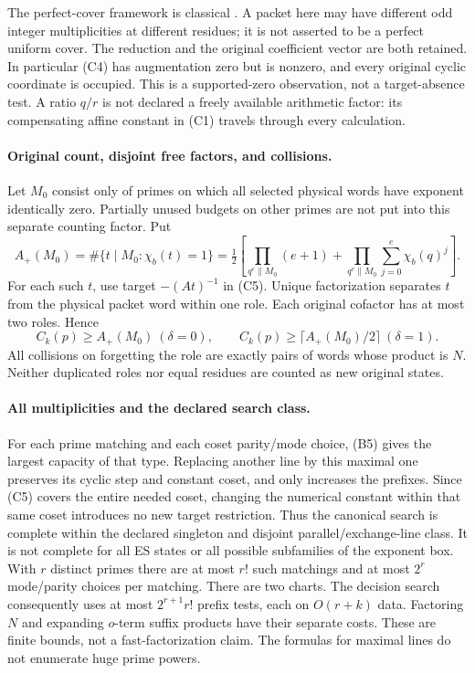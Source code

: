 The perfect-cover framework is classical \cite[Section 1; Theorem 12]{GH}.
A packet here may have different odd integer multiplicities at different
residues; it is not asserted to be a perfect uniform cover. The reduction and
the original coefficient vector are both retained. In particular (C4) has
augmentation zero but is nonzero, and every original cyclic coordinate is
occupied. This is a supported-zero observation, not a target-absence test.
A ratio $q/r$ is not declared a freely available arithmetic factor: its
compensating affine constant in (C1) travels through every calculation.

\paragraph{Original count, disjoint free factors, and collisions.}
Let $M_0$ consist only of primes on which all selected physical words have
exponent identically zero. Partially unused budgets on other primes are
not put into this separate counting factor. Put
\[
 A_+(M_0)=\#\{t\mid M_0:\chi_b(t)=1\}
 =\tfrac12\left[\prod_{q^e\parallel M_0}(e+1)+
 \prod_{q^e\parallel M_0}\sum_{j=0}^{e}\chi_b(q)^j\right].   \tag{C7}
\]
For each such $t$, use target $-(At)^{-1}$ in (C5).
Unique factorization separates $t$ from the physical packet word within
one role. Each original cofactor has at most two roles. Hence
\[
 \boxed{C_k(p)\ge A_+(M_0)\ (\delta=0),\qquad
 C_k(p)\ge\lceil A_+(M_0)/2\rceil\ (\delta=1).}             \tag{C8}
\]
All collisions on forgetting the role are exactly pairs of words whose
product is $N$. Neither duplicated roles nor equal residues are counted as
new original states.

\paragraph{All multiplicities and the declared search class.}
For each prime matching and each coset parity/mode choice, (B5) gives the
largest capacity of that type. Replacing another line by this maximal one
preserves its cyclic step and constant coset, and only increases the prefixes.
Since (C5) covers the entire needed coset, changing the numerical constant
within that same coset introduces no new target restriction. Thus the
canonical search is complete within the declared singleton and disjoint
parallel/exchange-line class. It is not complete for all ES states or all
possible subfamilies of the exponent box.
With $r$ distinct primes there are at most $r!$ such matchings and at most
$2^r$ mode/parity choices per matching. There are two charts.
The decision search consequently uses at most $2^{r+1}r!$ prefix tests,
each on $O(r+k)$ data. Factoring $N$ and expanding $o$-term suffix products
have their separate costs. These are finite bounds, not a fast-factorization
claim. The formulas for maximal lines do not enumerate huge prime powers.

